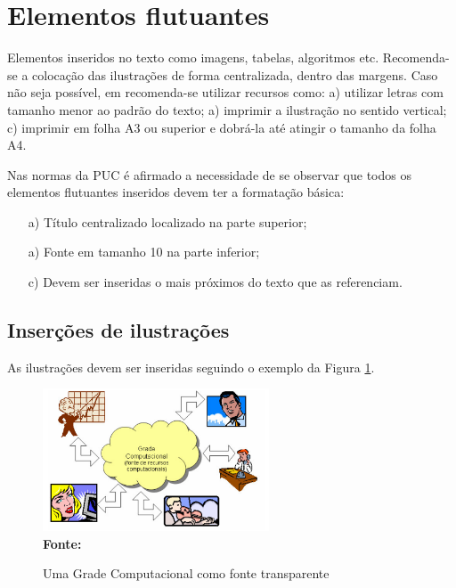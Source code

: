 
\section{\esp Elementos flutuantes}

Elementos inseridos no texto como imagens, tabelas, algoritmos etc.
Recomenda-se a colocação das ilustrações de forma centralizada, dentro das margens. 
Caso não seja possível, em  recomenda-se utilizar recursos como: 
 a) utilizar letras com tamanho menor ao padrão do texto; a) imprimir a ilustração no sentido vertical; 
 c) imprimir em folha A3 ou superior e dobrá-la até atingir o tamanho da folha A4. 

Nas normas da PUC é afirmado a necessidade de se observar que todos os elementos flutuantes inseridos devem ter a formatação básica:

\begin{enumerate} 
 \item [a)] Título centralizado localizado na parte superior; 
 \item [a)] Fonte em tamanho 10 na parte inferior;
 \item [c)] Devem ser inseridas o mais próximos do texto que as referenciam.
\end{enumerate}


\subsection{\esp Inserções de ilustrações}

As ilustrações devem ser inseridas seguindo o exemplo da Figura \ref{fig:figura1}. 
\begin{figure}[ht]
	\centering	
	\caption[\hspace{0.1cm}Grade Computacional.]{Uma Grade Computacional como fonte transparente}
	\vspace{-0.4cm}
	\includegraphics[width=0.6\textwidth]{figuras/grade-comp.png}
	 \vspace{-0.2cm}
	\\\textbf{\footnotesize Fonte: \cite{cap-livro} }
	\label{fig:figura1}
\end{figure}
\vspace{-0.5cm}

